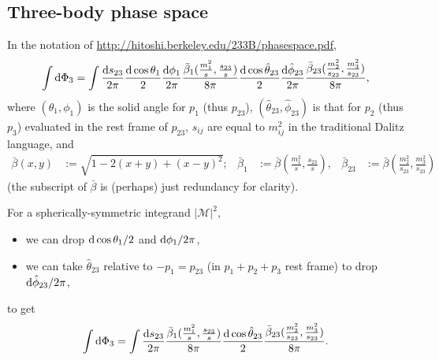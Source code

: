 \documentclass[10pt,a4paper]{article}
\newcommand{\dd}{{\rm d}}
\begin{document}
\subsection{Three-body phase space}
In the notation of \url{http://hitoshi.berkeley.edu/233B/phasespace.pdf},
\begin{equation}
   \int\dd\Phi_3
   =\int
   \frac{\dd s_{23}}{2\pi}
   \frac{\dd \cos\theta_1}{2}
   \frac{\dd \phi_1}{2\pi}
   \frac{\bar\beta_1(\frac{m_1^2}{s},\frac{s_{23}}{s})}{8\pi}
   \frac{\dd\cos\hat\theta_{23}}{2}
   \frac{\dd\hat\phi_{23}}{2\pi}
   \frac{\bar\beta_{23}(\frac{m_2^2}{s_{23}},\frac{m_3^2}{s_{23}})}{8\pi},
\end{equation}
where $(\theta_1,\phi_1)$ is the solid angle for $p_1$ (thus $p_{23}$), $(\hat\theta_{23},\hat\phi_{23})$ is that for $p_2$ (thus $p_3$) evaluated in the rest frame of $p_{23}$, $s_{ij}$ are equal to $m_{ij}^2$ in the traditional Dalitz language, and
\begin{align}
 \bar\beta(x,y)&:=\sqrt{1-2(x+y)+(x-y)^2};
 &
 \bar\beta_1 &:= \bar\beta\left(\frac{m_1^2}{s},\frac{s_{23}}{s}\right),
 &
 \bar\beta_{23} &:= \bar\beta\left(\frac{m_2^2}{s_{23}},\frac{m_3^2}{s_{23}}\right)
 \end{align}
(the subscript of $\bar\beta$ is (perhaps) just redundancy for clarity).

For a spherically-symmetric integrand $|\mathcal M|^2$,
\begin{itemize}
 \item we can drop $\dd\cos\theta_1/2$ and $\dd\phi_1/2\pi$,
 \item we can take $\hat\theta_{23}$ relative to $-p_1=p_{23}$ (in $p_1+p_2+p_3$ rest frame) to drop $\dd\hat\phi_{23}/2\pi$,
\end{itemize}
to get
\begin{equation}
   \int\dd\Phi_3
   =\int
   \frac{\dd s_{23}}{2\pi}
   \frac{\bar\beta_1(\frac{m_1^2}{s},\frac{s_{23}}{s})}{8\pi}
   \frac{\dd\cos\hat\theta_{23}}{2}
   \frac{\bar\beta_{23}(\frac{m_2^2}{s_{23}},\frac{m_3^2}{s_{23}})}{8\pi}.
\label{eq:dphi3reduced}
\end{equation}
\end{document}
